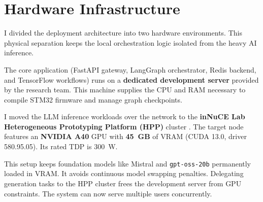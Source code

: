 \section{Hardware Infrastructure}
\label{sec:used_hardware}

I divided the deployment architecture into two hardware environments. This physical separation keeps the local orchestration logic isolated from the heavy AI inference.

The core application (FastAPI gateway, LangGraph orchestrator, Redis backend, and TensorFlow workflows) runs on a \textbf{dedicated development server} provided by the research team. This machine supplies the CPU and RAM necessary to compile STM32 firmware and manage graph checkpoints.

I moved the LLM inference workloads over the network to the \textbf{inNuCE Lab Heterogeneous Prototyping Platform (HPP)} cluster \cite{innuce_website}. The target node features an \textbf{NVIDIA A40} GPU with \textbf{45~GB} of VRAM (CUDA 13.0, driver 580.95.05). Its rated TDP is 300~W.

This setup keeps foundation models like Mistral and \texttt{gpt-oss-20b} permanently loaded in VRAM. It avoids continuous model swapping penalties. Delegating generation tasks to the HPP cluster frees the development server from GPU constraints. The system can now serve multiple users concurrently.
